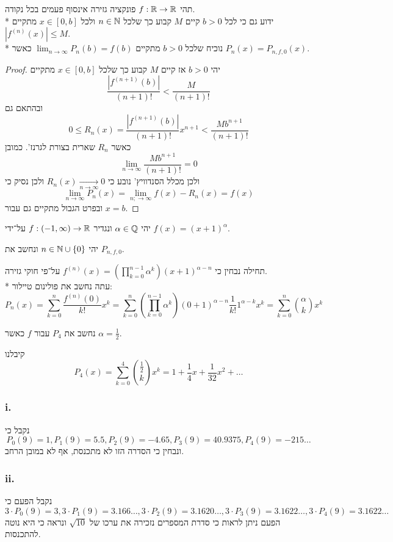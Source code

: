 \Question{}
תהי $f : \mathbb{R} \to \mathbb{R}$ פונקציה גזירה אינסוף פעמים בכל נקודה. \\*
ידוע גם כי לכל $b > 0$ קיים $M$ קבוע כך שלכל $n \in \mathbb{N}$ ולכל $x \in [0, b]$ מתקיים $|f^{(n)}(x)| \le M$. \\*
נוכיח שלכל $b > 0$ מתקיים $\lim_{n \to \infty} P_n(b) = f(b)$ כאשר $P_n(x) = P_{n, f, 0}(x)$.
\begin{proof}
	יהי $b > 0$ אז קיים $M$ קבוע כך שלכל $x \in [0, b]$ מתקיים
	\[
		\frac{|f^{(n + 1)}(b)|}{(n + 1)!} < \frac{M}{(n + 1)!}
	\]
	ובהתאם גם
	\[
		0 \le R_n(x) = \frac{|f^{(n + 1)}(b)|}{(n + 1)!}x^{n + 1} < \frac{M b^{n + 1}}{(n + 1)!}
	\]
	כאשר $R_n$ שארית בצורת לגרנז'.
	כמובן
	\[
		\lim_{n \to \infty} \frac{M b^{n + 1}}{(n + 1)!} = 0
	\]
	ולכן מכלל הסנדוויץ' נובע כי $R_n(x) \xrightarrow[n \to \infty]{} 0$ ולכן נסיק כי
	\[
		\lim_{n \to \infty} P_n(x) = \lim_{n; \to \infty} f(x) - R_n(x) = f(x)
	\]
	ובפרט הגבול מתקיים גם עבור $x = b$.
\end{proof}

\Question{}
יהי $\alpha \in \mathbb{Q}$ ונגדיר $f : (-1, \infty) \to \mathbb{R}$ על־ידי $f(x) = {(x + 1)}^\alpha$.

\Subquestion{}
יהי $n \in \mathbb{N} \cup \{0\}$ ונחשב את $P_{n, f, 0}$.

תחילה נבחין כי $f^{(n)}(x) = (\prod_{k = 0}^{n - 1} \alpha^k) {(x + 1)}^{\alpha - n}$ על־פי חוקי גזירה. \\*
עתה נחשב את פולינום טיילור:
\[
	P_n(x) = \sum_{k = 0}^{n} \frac{f^{(n)}(0)}{k!} x^k
	= \sum_{k = 0}^{n} (\prod_{k = 0}^{n - 1} \alpha^k) {(0 + 1)}^{\alpha - n} \frac{1}{k!} 1^{\alpha - k} x^k
	= \sum_{k = 0}^{n} \binom{\alpha}{k} x^k
\]

\Subquestion{}
נחשב את $P_4$ עבור $f$ כאשר $\alpha = \frac{1}{2}$.

קיבלנו
\[
	P_4(x) = \sum_{k = 0}^{4} \binom{\frac{1}{2}}{k} x^k
	= 1 + \frac{1}{4} x + \frac{1}{32} x^2 + \dots
\]

\Subquestion{}
\subsubsection{i.}
נקבל כי
\[
	P_0(9) = 1,
	P_1(9) = 5.5,
	P_2(9) = -4.65,
	P_3(9) = 40.9375,
	P_4(9) = -215\dots
\]
ונבחין כי הסדרה הזו לא מתכנסת, אף לא במובן הרחב.

\subsubsection{ii.}
נקבל הפעם כי
\[
	3 \cdot P_0(9) = 3,
	3 \cdot P_1(9) = 3.166\dots,
	3 \cdot P_2(9) = 3.1620\dots,
	3 \cdot P_3(9) = 3.1622\dots,
	3 \cdot P_4(9) = 3.1622\dots
\]
הפעם ניתן לראות כי סדרת המספרים נזכירה את ערכו של $\sqrt{10}$ ונראה כי היא נוטה להתכנסות.

